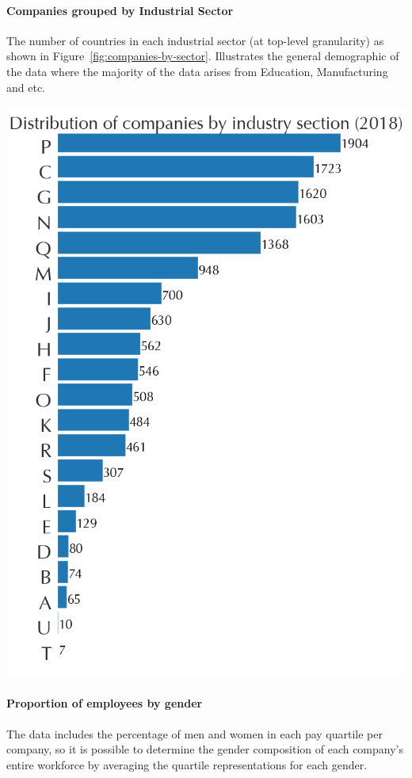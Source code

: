 \paragraph{Companies grouped by Industrial Sector}
    The number of countries in each industrial sector (at top-level granularity) as shown in Figure\ \ref{fig:companies-by-sector}. Illustrates the general demographic of the data where the majority of the data arises from Education, Manufacturing and etc.

    \begin{centering}
        \includegraphics[width=0.6\linewidth]{images/2018-all-companies-sectors.png}
        \label{fig:companies-by-sector}
    \end{centering}
\vspace{-1.5em}
\paragraph*{Proportion of employees by gender}
The data includes the percentage of men and women in each pay quartile per company, so it is possible to determine the gender composition of each company's entire workforce by averaging the quartile representations for each gender. 


